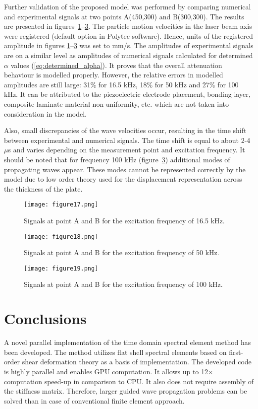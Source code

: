 \documentclass[12pt]{iopart}
\begin{document}
Further validation of the proposed model was performed by comparing numerical and experimental signals at two points A(450,300) and B(300,300).
The results are presented in figures~\ref{fig:damping_signals_16_5}--\ref{fig:damping_signals_100}.
The particle motion velocities in the laser beam axis were registered (default option in Polytec software). 
Hence, units of the registered amplitude in figures \ref{fig:damping_signals_16_5}--\ref{fig:damping_signals_100} was set to mm/s.
The amplitudes of experimental signals are on a similar level as amplitudes of numerical signals calculated for determined \(\alpha\) values (\ref{eq:determined_alpha}).
It proves that the overall attenuation behaviour is modelled properly.
However, the relative errors in modelled amplitudes are still large: 31\% for 16.5 kHz, 
18\% for 50 kHz and 27\% for 100 kHz.
It can be attributed to the piezoelectric electrode placement, bonding layer, composite laminate material non-uniformity, etc. which are not taken into consideration in the model. 

Also, small discrepancies of the wave velocities occur, resulting in the time shift between experimental and numerical signals.
The time shift is equal to about 2-4 \(\mu\)s and varies depending on the measurement point and excitation frequency.
It should be noted that for frequency 100 kHz (figure~\ref{fig:damping_signals_100}) additional modes of propagating waves appear.
These modes cannot be represented correctly by the model due to low order theory used for the displacement representation across the thickness of the plate.
\begin{figure} [h!]
	\centering
		\texttt{[image: figure17.png]}
		\caption{Signals at point A and B for the excitation frequency of 16.5 kHz.}
		\label{fig:damping_signals_16_5}
\end{figure}
\begin{figure} [h!]
	\centering
	\texttt{[image: figure18.png]}
	\caption{Signals at point A and B for the excitation frequency of 50 kHz.}
	\label{fig:damping_signals_50}
\end{figure}
\begin{figure} [h!]
	\centering
	\texttt{[image: figure19.png]}
	\caption{Signals at point A and B for the excitation frequency of 100 kHz.}
	\label{fig:damping_signals_100}
\end{figure}
\clearpage
\section{Conclusions}
A novel parallel implementation of the time domain spectral element method has been developed. The method utilizes flat shell spectral elements based on first-order shear deformation theory as a basis of implementation. The developed code is highly parallel and enables GPU computation. It allows up to 12\(\times\) computation speed-up in comparison to CPU. It also does not require assembly of the stiffness matrix. Therefore, larger guided wave propagation problems can be solved than in case of conventional finite element approach.
\end{document}
